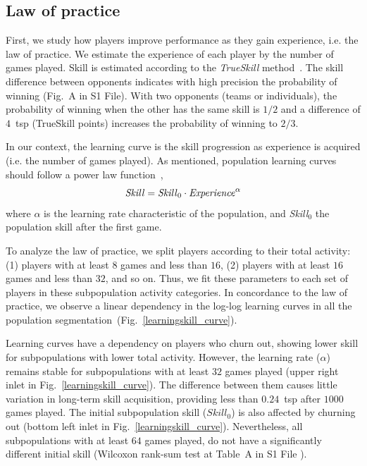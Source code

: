 \documentclass[a4paper,10pt]{book}
\theoremstyle{definition}
\begin{document}
\subsection{Law of practice}

First, we study how players improve performance as they gain experience, i.e. the law of practice. 
We estimate the experience of each player by the number of games played.
Skill is estimated according to the \emph{TrueSkill} method~\cite{Herbrich2007}.
The skill difference between opponents indicates with high precision the probability of winning (Fig.~A in S1 File).
With two opponents (teams or individuals), the probability of winning when the other has the same skill is $1/2$ and a difference of $4$~tsp (TrueSkill points) increases the probability of winning to $2/3$. 

In our context, the learning curve is the skill progression as experience is acquired (i.e. the number of games played). 
As mentioned, population learning curves should follow a power law function~\cite{Newell1981},
\begin{equation}\label{lawOfPractice}
   \text{\emph{Skill}} = \text{\emph{Skill}}_0 \cdot \text{\emph{Experience}}^{\alpha}
\end{equation} 
where $\alpha$ is the learning rate characteristic of the population, and \emph{Skill}$_0$ the population skill after the first game.

To analyze the law of practice, we split players according to their total activity: (1) players with at least $8$ games and less than $16$, (2) players with at least $16$ games and less than $32$, and so on.
Thus, we fit these parameters to each set of players in these subpopulation activity categories.
In concordance to the law of practice, we observe a linear dependency in the log-log learning curves in all the population segmentation~(Fig.~\ref{learningskill_curve}).

Learning curves have a dependency on players who churn out, showing lower skill for subpopulations with lower total activity.
However, the learning rate ($\alpha$) remains stable for subpopulations with at least $32$ games played (upper right inlet in Fig.~\ref{learningskill_curve}).
The difference between them causes little variation in long-term skill acquisition, providing less than $0.24$~tsp after $1000$ games played.
The initial subpopulation skill ($Skill_0$) is also affected by churning out (bottom left inlet in Fig.~\ref{learningskill_curve}).
Nevertheless, all subpopulations with at least $64$ games played, do not have a significantly different initial skill (Wilcoxon rank-sum test at Table~A in S1 File ). 
\end{document}
